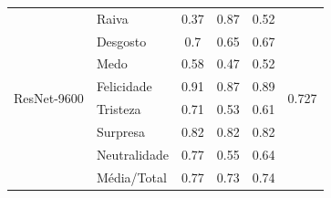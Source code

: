 \documentclass{beamer}
\begin{document}
\begin{frame}
\begin{table}[]
\begin{tabular}{llcccc}
\multirow{8}{*}{ResNet-9600}           & Raiva                 & 0.37                                  & 0.87                                   & 0.52                                  & \multirow{8}{*}{0.727}                \\
                                         & Desgosto              & 0.7                                   & 0.65                                   & 0.67                                  &                                       \\
                                         & Medo                  & 0.58                                  & 0.47                                   & 0.52                                  &                                       \\
                                         & Felicidade            & 0.91                                  & 0.87                                   & 0.89                                  &                                       \\
                                         & Tristeza              & 0.71                                  & 0.53                                   & 0.61                                  &                                       \\
                                         & Surpresa              & 0.82                                  & 0.82                                   & 0.82                                  &                                       \\
                                         & Neutralidade          & 0.77                                  & 0.55                                   & 0.64                                  &                                       \\
                                         & Média/Total           & 0.77                                  & 0.73                                   & 0.74                                  &                                       \\ \hline


\end{tabular}
\end{table}
\end{frame}
\end{document}
